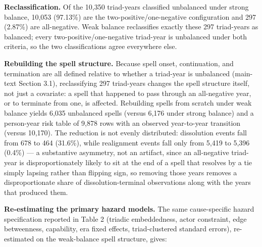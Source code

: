 \documentclass[Afour,sageh,times,doublespace]{sagej}
\begin{document}
\textbf{Reclassification.} Of the 10,350 triad-years classified unbalanced under strong balance, 10,053 (97.13\%) are the two-positive/one-negative configuration and 297 (2.87\%) are all-negative. Weak balance reclassifies exactly these 297 triad-years as balanced; every two-positive/one-negative triad-year is unbalanced under both criteria, so the two classifications agree everywhere else.

\textbf{Rebuilding the spell structure.} Because spell onset, continuation, and termination are all defined relative to whether a triad-year is unbalanced (main-text Section 3.1), reclassifying 297 triad-years changes the spell structure itself, not just a covariate: a spell that happened to pass through an all-negative year, or to terminate from one, is affected. Rebuilding spells from scratch under weak balance yields 6,035 unbalanced spells (versus 6,176 under strong balance) and a person-year risk table of 9,878 rows with an observed year-to-year transition (versus 10,170). The reduction is not evenly distributed: dissolution events fall from 678 to 464 (31.6\%), while realignment events fall only from 5,419 to 5,396 (0.4\%) --- a substantive asymmetry, not an artifact, since an all-negative triad-year is disproportionately likely to sit at the end of a spell that resolves by a tie simply lapsing rather than flipping sign, so removing those years removes a disproportionate share of dissolution-terminal observations along with the years that produced them.

\textbf{Re-estimating the primary hazard models.} The same cause-specific hazard specification reported in Table 2 (triadic embeddedness, actor constraint, edge betweenness, capability, era fixed effects, triad-clustered standard errors), re-estimated on the weak-balance spell structure, gives:
\end{document}
